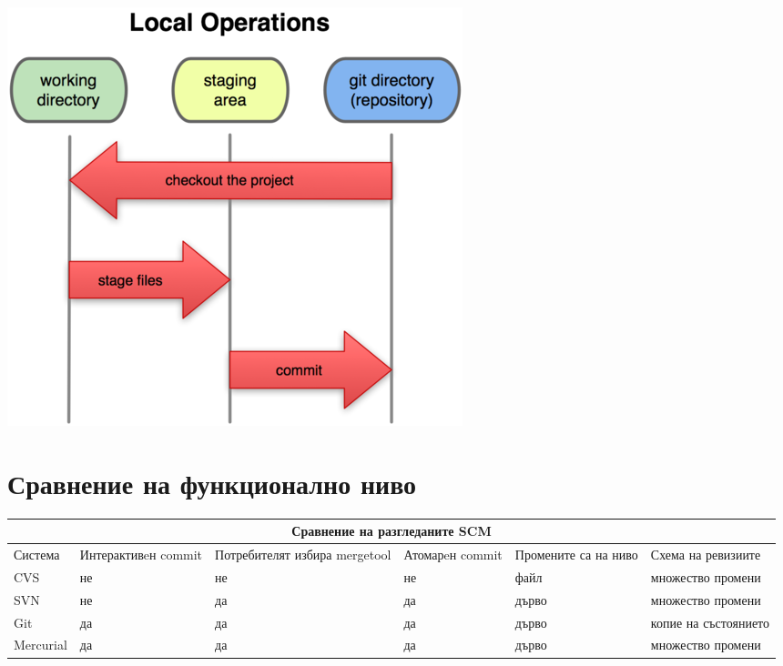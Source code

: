 \documentclass[a4paper]{article}
\begin{document}
      \vspace{6 mm}
      \begin{center}
        \includegraphics[scale=0.8]{git_local_ops.png}
      \end{center}

\section{Сравнение на функционално ниво}

  \vspace{5 mm}
  \begin{tabular} { | l | p{22 mm} | p{21 mm} | p{14 mm} | p{17 mm} | p{34 mm} |}
  \multicolumn{6}{c}{Сравнение на разгледаните SCM} \\
  \hline
  Система     & Интерактивeн commit & Потребителят избира mergetool & Атомарeн commit & Промените са на ниво & Схема на ревизиите \\
  \hline
  CVS         & не                  & не                            & не              & файл                 & множество промени \\
  SVN         & не                  & да                            & да              & дърво                & множество промени \\
  Git         & да                  & да                            & да              & дърво                & копие на състоянието \\
  Mercurial   & да                  & да                            & да              & дърво                & множество промени\\
  \hline
  \end{tabular}
\end{document}
